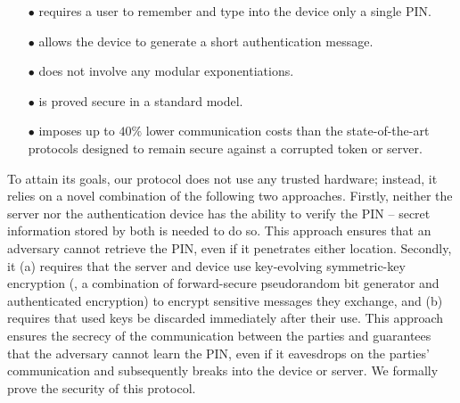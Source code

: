 \begin{itemize}
\item[$\bullet$] requires a user to remember and type into the device only a single PIN.

\item[$\bullet$] {allows the device to generate a short authentication message.} 

\item[$\bullet$] does not involve any modular exponentiations.

\item[$\bullet$] is proved secure in a standard model.

\item[$\bullet$]  imposes up to $40\%$ lower communication costs than the state-of-the-art protocols designed to remain secure against a corrupted token or server. 


\end{itemize}

To attain its goals, our protocol does not use any trusted hardware; instead, it relies on a novel combination of the following two approaches. Firstly, neither the server nor the authentication device has the ability to verify the PIN -- secret information stored by both is needed to do so. This approach ensures that an adversary cannot retrieve the PIN, even if it penetrates either location. 
Secondly, it  (a) requires that the server and device use key-evolving symmetric-key encryption (\ie, a combination of forward-secure pseudorandom bit generator and authenticated encryption) to encrypt sensitive messages they exchange,  and (b) requires that used keys be discarded immediately after their use.
This approach ensures the secrecy of the communication between the parties and guarantees that the adversary cannot learn the PIN, even if it eavesdrops on the parties' communication and subsequently breaks into the device or server. We formally prove the security of this protocol. 





